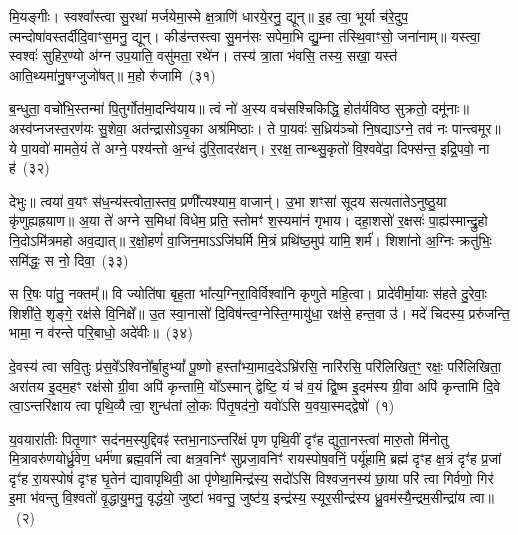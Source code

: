 मि॒यङ्गीः। स्वश्वा᳚स्त्वा सु॒रथा॑ मर्जयेमा॒स्मे क्ष॒त्राणि॑ धारये॒रनु॒ द्यून्॥ इ॒ह त्वा॒ भूर्या च॑रे॒दुप॒ त्मन्दोषा॑वस्तर्दीदि॒वाꣳ\-स॒मनु॒ द्यून्। कीड॑न्तस्त्वा सु॒मन॑सः सपेमा॒भि द्यु॒म्ना त॑स्थि॒वाꣳसो॒ जना॑नाम्॥ यस्त्वा॒ स्वश्वः॑ सुहिर॒ण्यो अ॑ग्न उप॒याति॒ वसु॑मता॒ रथे॑न। तस्य॑ त्रा॒ता भ॑वसि॒ तस्य॒ सखा॒ यस्त॑ आति॒थ्यमा॑नु॒षग्जुजो॑षत्॥ म॒हो रु॑जामि~(३१)

ब॒न्धुता॒ वचो॑भि॒स्तन्मा॑ पि॒तुर्गोत॑मा॒दन्वि॑याय॥ त्वं नो॑ अ॒स्य वच॑सश्चिकिद्धि॒ होत॑र्यविष्ठ सुक्रतो॒ दमू॑नाः॥ अस्व॑प्नजस्त॒रण॑यः सु॒शेवा॒ अत॑न्द्रासो\-ऽवृ॒का अश्र॑मिष्ठाः। ते पा॒यवः॑ स॒ध्रिय॑ञ्चो नि॒षद्या\-ऽग्ने॒ तव॑ नः पान्त्वमूर॥ ये पा॒यवो॑ मामते॒यं ते॑ अग्ने॒ पश्य॑न्तो अ॒न्धं दु॑रि॒तादर॑क्षन्। र॒रक्ष॒ तान्थ्सु॒कृतो॑ वि॒श्ववे॑दा॒ दिफ्स॑न्त॒ इद्रि॒पवो॒ ना ह॑~(३२)

देभुः॥ त्वया॑ व॒यꣳ स॑ध॒न्य॑स्त्वोता॒स्तव॒ प्रणी᳚त्यश्याम॒ वाजान्॑। उ॒भा शꣳसा॑ सूदय सत्यताते\-ऽनुष्ठु॒या कृ॑णुह्यह्रयाण॥ अ॒या ते॑ अग्ने स॒मिधा॑ विधेम॒ प्रति॒ स्तोमꣳ॑ श॒स्यमा॑नं गृभाय। दहा॒शसो॑ र॒क्षसः॑ पा॒ह्य॑स्मान्द्रु॒हो नि॒दोऽमि॑त्रमहो अव॒द्यात्॥ र॒क्षो॒हणं॑ वा॒जिन॒मा\-ऽ\-ऽजि॑घर्मि मि॒त्रं प्रथि॑ष्ठ॒मुप॑ यामि॒ शर्म॑। शिशा॑नो अ॒ग्निः क्रतु॑भिः॒ समि॑द्धः॒ स नो॒ दिवा॒~(३३)

स रि॒षः पा॑तु॒ नक्तम्᳚॥ वि ज्योति॑षा बृह॒ता भा᳚त्य॒ग्निरा॒विर्विश्वा॑नि कृणुते महि॒त्वा। प्रादे॑वीर्मा॒याः स॑हते दु॒रेवाः॒ शिशी॑ते॒ शृङ्गे॒ रक्ष॑से वि॒निक्षे᳚॥ उ॒त स्वा॒नासो॑ दि॒विष॑न्त्व॒ग्नेस्ति॒ग्मायु॑धा॒ रक्ष॑से॒ हन्त॒वा उ॑। मदे॑ चिदस्य॒ प्ररु॑जन्ति॒ भामा॒ न व॑रन्ते परि॒बाधो॒ अदे॑वीः॥~(३४)

{}


\setcounter{anuvakam}{0}
दे॒वस्य॑ त्वा सवि॒तुः प्र॑स॒वे᳚\-ऽश्विनो᳚र्बा॒हु\-भ्यां᳚ पू॒ष्णो हस्ता᳚भ्या॒माद॒दे\-ऽभ्रि॑रसि॒ नारि॑रसि॒ परि॑लिखित॒ꣳ॒ रक्षः॒ परि॑लिखिता॒ अरा॑तय इ॒दम॒हꣳ रक्ष॑सो ग्री॒वा अपि॑ कृन्तामि॒ यो᳚\-ऽस्मान् द्वेष्टि॒ यं च॑ व॒यं द्वि॒ष्म इ॒दम॑स्य ग्री॒वा अपि॑ कृन्तामि दि॒वे त्वा॒\-ऽन्तरि॑क्षाय त्वा पृथि॒व्यै त्वा॒ शुन्ध॑तां लो॒कः पि॑तृ॒षद॑नो॒ यवो॑\-ऽसि य॒वया॒स्मद्द्वेषो॑~(१)

य॒वयारा॑तीः पितृ॒णाꣳ सद॑नम॒स्युद्दिवꣴ॑ स्तभा॒ना\-ऽन्तरि॑क्षं पृण पृथि॒वीं दृꣳ॑ह द्युता॒नस्त्वा॑ मारु॒तो मि॑नोतु मि॒त्रावरु॑णयोर्ध्रु॒वेण॒ धर्म॑णा ब्रह्म॒वनिं॑ त्वा क्षत्र॒वनिꣳ॑ सुप्रजा॒वनिꣳ॑ रायस्पोष॒वनिं॒ पर्यू॑हामि॒ ब्रह्म॑ दृꣳह क्ष॒त्रं दृꣳ॑ह प्र॒जां दृꣳ॑ह रा॒यस्पोषं॑ दृꣳह घृ॒तेन॑ द्यावा\-पृथिवी॒ आ पृ॑णेथा॒मिन्द्र॑स्य॒ सदो॑\-ऽसि विश्वज॒नस्य॑ छा॒या परि॑ त्वा गिर्वणो॒ गिर॑ इ॒मा भ॑वन्तु वि॒श्वतो॑ वृ॒द्धायु॒मनु॒ वृद्ध॑यो॒ जुष्टा॑ भवन्तु॒ जुष्ट॑य॒ इन्द्र॑स्य॒ स्यूर॒सीन्द्र॑स्य ध्रु॒वम॑स्यै॒न्द्रम॒सीन्द्रा॑य त्वा॥~(२)


